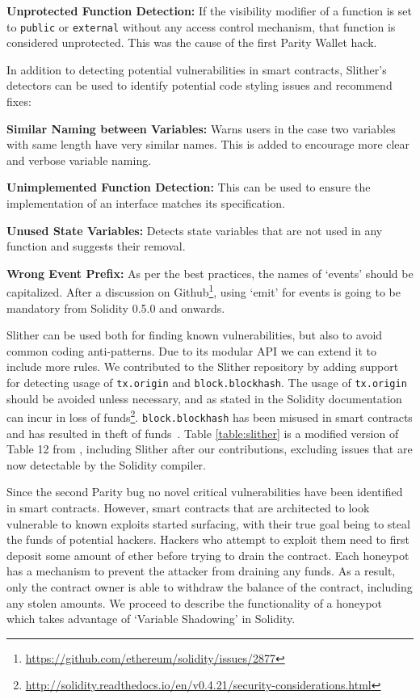 \textbf{Unprotected Function Detection:} If the visibility modifier of a function is set to \texttt{public} or \texttt{external} without any access control mechanism, that function is considered unprotected. This was the cause of the first Parity Wallet hack.

In addition to detecting potential vulnerabilities in smart contracts, Slither's detectors can be used to identify potential code styling issues and recommend fixes:

\textbf{Similar Naming between Variables:} Warns users in the case two variables with same length have very similar names. This is added to encourage more clear and verbose variable naming.

\textbf{Unimplemented Function Detection:} This can be used to ensure the implementation of an interface matches its specification.

\textbf{Unused State Variables:} Detects state variables that are not used in any function and suggests their removal.

\textbf{Wrong Event Prefix:} As per the best practices, the names of `events' should be capitalized. After a discussion on Github\footnote{\url{https://github.com/ethereum/solidity/issues/2877}}, using `emit' for events is going to be mandatory from Solidity 0.5.0 and onwards.

Slither can be used both for finding known vulnerabilities, but also to avoid common coding anti-patterns. Due to its modular API we can extend it to include more rules. We contributed to the Slither repository by adding support for detecting usage of \texttt{tx.origin} and \texttt{block.blockhash}. The usage of \texttt{tx.origin} should be avoided unless necessary, and as stated in the Solidity documentation can incur in loss of funds\footnote{\url{http://solidity.readthedocs.io/en/v0.4.21/security-considerations.html}}. \texttt{block.blockhash} has been misused in smart contracts and has resulted in theft of funds~\cite{smartbillions}. Table \ref{table:slither} is a modified version of Table 12 from \cite{tools}, including Slither after our contributions, excluding issues that are now detectable by the Solidity compiler.



Since the second Parity bug no novel critical vulnerabilities have been identified in smart contracts. However, smart contracts that are architected to look vulnerable to known exploits started surfacing, with their true goal being to steal the funds of potential hackers. Hackers who attempt to exploit them need to first deposit some amount of ether before trying to drain the contract. Each honeypot has a mechanism to prevent the attacker from draining any funds. As a result, only the contract owner is able to withdraw the balance of the contract, including any stolen amounts. We proceed to describe the functionality of a honeypot which takes advantage of `Variable Shadowing' in Solidity. 

